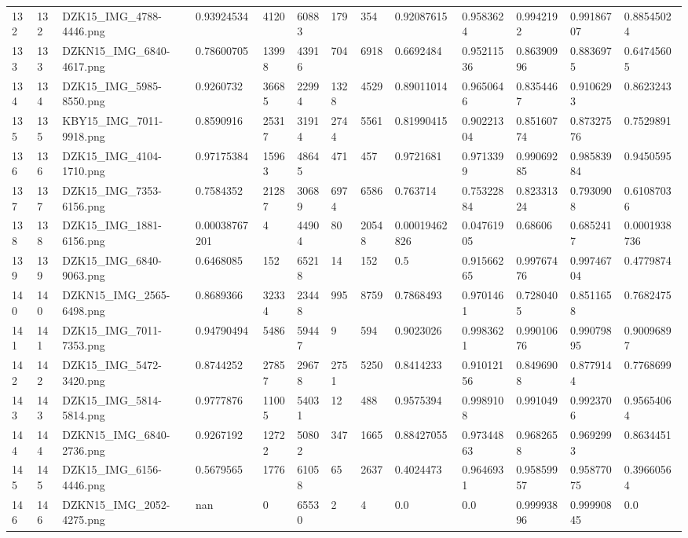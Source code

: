 \documentclass[11pt, a4paper, twoside]{report}
\begin{document}
\begin{longtable}[c]{@{}lllllllllllll@{}}
132 & 132 & DZK15\_IMG\_4788-4446.png & 0.93924534 & 4120 & 60883 & 179 & 354 & 0.92087615 & 0.9583624 & 0.9942192 & 0.99186707 & 0.88545024 \\
133 & 133 & DZKN15\_IMG\_6840-4617.png & 0.78600705 & 13998 & 43916 & 704 & 6918 & 0.6692484 & 0.95211536 & 0.86390996 & 0.8836975 & 0.64745605 \\
134 & 134 & DZK15\_IMG\_5985-8550.png & 0.9260732 & 36685 & 22994 & 1328 & 4529 & 0.89011014 & 0.9650646 & 0.8354467 & 0.9106293 & 0.8623243 \\
135 & 135 & KBY15\_IMG\_7011-9918.png & 0.8590916 & 25317 & 31914 & 2744 & 5561 & 0.81990415 & 0.90221304 & 0.85160774 & 0.87327576 & 0.7529891 \\
136 & 136 & DZK15\_IMG\_4104-1710.png & 0.97175384 & 15963 & 48645 & 471 & 457 & 0.9721681 & 0.9713399 & 0.99069285 & 0.98583984 & 0.9450595 \\
137 & 137 & DZK15\_IMG\_7353-6156.png & 0.7584352 & 21287 & 30689 & 6974 & 6586 & 0.763714 & 0.75322884 & 0.82331324 & 0.7930908 & 0.61087036 \\
138 & 138 & DZK15\_IMG\_1881-6156.png & 0.00038767201 & 4 & 44904 & 80 & 20548 & 0.00019462826 & 0.04761905 & 0.68606 & 0.6852417 & 0.0001938736 \\
139 & 139 & DZK15\_IMG\_6840-9063.png & 0.6468085 & 152 & 65218 & 14 & 152 & 0.5 & 0.91566265 & 0.99767476 & 0.99746704 & 0.4779874 \\
140 & 140 & DZKN15\_IMG\_2565-6498.png & 0.8689366 & 32334 & 23448 & 995 & 8759 & 0.7868493 & 0.9701461 & 0.7280405 & 0.8511658 & 0.7682475 \\
141 & 141 & DZK15\_IMG\_7011-7353.png & 0.94790494 & 5486 & 59447 & 9 & 594 & 0.9023026 & 0.9983621 & 0.99010676 & 0.99079895 & 0.90096897 \\
142 & 142 & DZK15\_IMG\_5472-3420.png & 0.8744252 & 27857 & 29678 & 2751 & 5250 & 0.8414233 & 0.91012156 & 0.8496908 & 0.8779144 & 0.7768699 \\
143 & 143 & DZK15\_IMG\_5814-5814.png & 0.9777876 & 11005 & 54031 & 12 & 488 & 0.9575394 & 0.9989108 & 0.991049 & 0.9923706 & 0.95654064 \\
144 & 144 & DZKN15\_IMG\_6840-2736.png & 0.9267192 & 12722 & 50802 & 347 & 1665 & 0.88427055 & 0.97344863 & 0.9682658 & 0.9692993 & 0.8634451 \\
145 & 145 & DZK15\_IMG\_6156-4446.png & 0.5679565 & 1776 & 61058 & 65 & 2637 & 0.4024473 & 0.9646931 & 0.95859957 & 0.95877075 & 0.39660564 \\
146 & 146 & DZKN15\_IMG\_2052-4275.png & nan & 0 & 65530 & 2 & 4 & 0.0 & 0.0 & 0.99993896 & 0.99990845 & 0.0 \\

\end{longtable}
\end{document}
